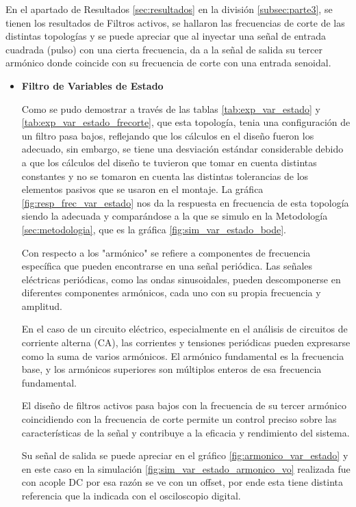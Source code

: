         En el apartado de Resultados \ref{sec:resultados} en la división \ref{subsec:parte3}, se tienen los resultados de Filtros activos, se hallaron las frecuencias de corte de las distintas topologías y se puede apreciar que al inyectar una señal de entrada cuadrada (pulso) con una cierta frecuencia, da a la señal de salida su tercer armónico donde coincide con su frecuencia de corte con una entrada senoidal.

        \begin{itemize}
            \item \textbf{Filtro de Variables de Estado}

                Como se pudo demostrar a través de las tablas \ref{tab:exp_var_estado} y \ref{tab:exp_var_estado_frecorte}, que esta topología, tenia una configuración de un filtro pasa bajos, reflejando que los cálculos en el diseño fueron los adecuado, sin embargo, se tiene una desviación estándar considerable debido a que los cálculos del diseño te tuvieron que tomar en cuenta distintas constantes y no se tomaron en cuenta las distintas tolerancias de los elementos pasivos que se usaron en el montaje. La gráfica \ref{fig:resp_frec_var_estado} nos da la respuesta en frecuencia de esta topología siendo la adecuada y comparándose a la que se simulo en la Metodología \ref{sec:metodologia}, que es la gráfica \ref{fig:sim_var_estado_bode}.

                Con respecto a los "armónico" se refiere a componentes de frecuencia específica que pueden encontrarse en una señal periódica. Las señales eléctricas periódicas, como las ondas sinusoidales, pueden descomponerse en diferentes componentes armónicos, cada uno con su propia frecuencia y amplitud.

                En el caso de un circuito eléctrico, especialmente en el análisis de circuitos de corriente alterna (CA), las corrientes y tensiones periódicas pueden expresarse como la suma de varios armónicos. El armónico fundamental es la frecuencia base, y los armónicos superiores son múltiplos enteros de esa frecuencia fundamental.

                El diseño de filtros activos pasa bajos con la frecuencia de su tercer armónico coincidiendo con la frecuencia de corte permite un control preciso sobre las características de la señal y contribuye a la eficacia y rendimiento del sistema.

                Su señal de salida se puede apreciar en el gráfico \ref{fig:armonico_var_estado} y en este caso en la simulación \ref{fig:sim_var_estado_armonico_vo} realizada fue con acople DC por esa razón se ve con un offset, por ende esta tiene distinta referencia que la indicada con el osciloscopio digital.


\end{itemize}
